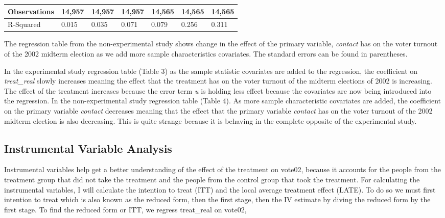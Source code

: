 \documentclass[a4paper]{article}
\begin{document}
\begin{table}[h!]
\begin{tabular}{|l|l|l|l|l|l|l|}
Observations & 14,957    & 14,957    & 14,957     & 14,565     & 14,565     & 14,565     \\ \hline
R-Squared    & 0.015     & 0.035     & 0.071      & 0.079      & 0.256      & 0.311      \\ \hline
\end{tabular}
\RaggedRight The regression table from the non-experimental study shows change in the effect of the primary variable, \textit{contact} has on the voter turnout of the 2002 midterm election as we add more sample characteristics covariates. The standard errors can be found in parentheses.
\end{table}

\begin{flushleft}
In the experimental study regression table (Table 3) as the sample statistic covariates are added to the regression, the coefficient on \textit{treat\_real} slowly increases meaning the effect that the treatment has on the voter turnout of the midterm elections of 2002 is increasing. The effect of the treatment increases because the error term \textit{u} is holding less effect because the covariates are now being introduced into the regression. In the non-experimental study regression table (Table 4). As more sample characteristic covariates are added, the coefficient on the primary variable \textit{contact} decreases meaning that the effect that the primary variable \textit{contact} has on the voter turnout of the 2002 midterm election is also decreasing. This is quite strange because it is behaving in the complete opposite of the experimental study. 
\end{flushleft}




\subsection{Instrumental Variable Analysis}

Instrumental variables help get a better understanding of the effect of the treatment on vote02, because it accounts for the people from the treatment group that did not take the treatment and the people from the control group that took the treatment. For calculating the instrumental variables, I will calculate the intention to treat (ITT) and the local average treatment effect (LATE). To do so we must first intention to treat which is also known as the reduced form, then the first stage, then the IV estimate by diving the reduced form by the first stage. To find the reduced form or ITT, we regress treat\_real on vote02,
\end{document}
